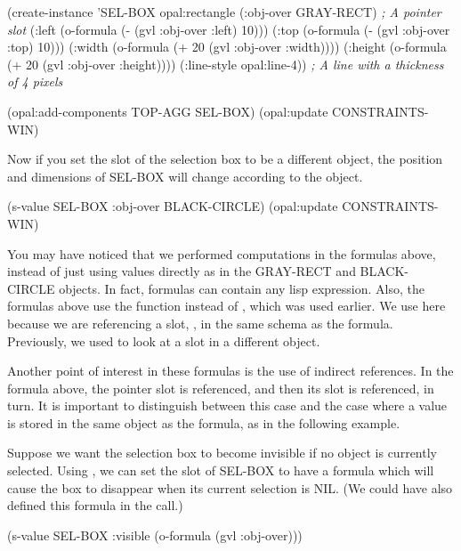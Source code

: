 \begin{programexample}
(create-instance 'SEL-BOX opal:rectangle
   (:obj-over GRAY-RECT)  {\it ; A pointer slot}
   (:left (o-formula (- (gvl :obj-over :left) 10)))
   (:top (o-formula (- (gvl :obj-over :top) 10)))
   (:width (o-formula (+ 20 (gvl :obj-over :width))))
   (:height (o-formula (+ 20 (gvl :obj-over :height))))
   (:line-style opal:line-4))  {\it ; A line with a thickness of 4 pixels}
		
(opal:add-components TOP-AGG SEL-BOX)
(opal:update CONSTRAINTS-WIN)
\end{programexample}

Now if you set the  slot of the selection box to be a
different object, the position and dimensions of SEL-BOX will change
according to the object.

\begin{programexample}
(s-value SEL-BOX :obj-over BLACK-CIRCLE)
(opal:update CONSTRAINTS-WIN)
\end{programexample}

You may have noticed that we performed computations in the formulas
above, instead of just using values directly as in the GRAY-RECT and
BLACK-CIRCLE objects.  In fact, formulas can contain any lisp
expression.  Also, the formulas above use the function 
instead of , which was used earlier.  We use  here
because we are referencing a slot, , in the same schema
as the formula.  Previously, we used  to look at a slot in a
different object.

Another point of interest in these formulas is the use of indirect
references.  In the  formula above, the pointer slot 
is referenced, and then its  slot is referenced, in turn.
It is important to distinguish between this case and the case where
a value is stored in the same object as the formula, as in the
following example.

Suppose we want the selection box to become invisible if no object is
currently selected.  Using , we can set the 
slot of SEL-BOX to have a formula which will cause the box to
disappear when its current selection is NIL.  (We could have also
defined this formula in the  call.)

\begin{programexample}
(s-value SEL-BOX :visible (o-formula (gvl :obj-over)))
\end{programexample}

